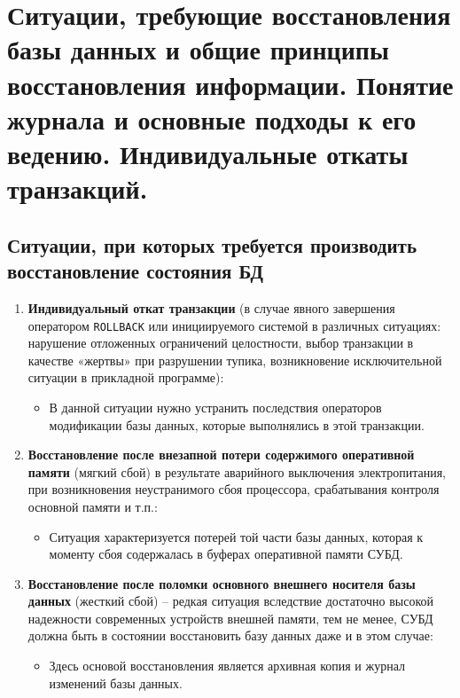 \documentclass[a4paper,12pt]{article}
\begin{document}
\section{Ситуации, требующие восстановления базы данных и общие принципы восстановления информации. Понятие журнала и основные подходы к его ведению. Индивидуальные откаты транзакций.}

\subsection{Ситуации, при которых требуется производить восстановление состояния БД}

\begin{enumerate}
    \item \textbf{Индивидуальный откат транзакции} (в случае явного завершения оператором \texttt{ROLLBACK} или инициируемого системой в различных ситуациях: нарушение отложенных ограничений целостности, выбор транзакции в качестве «жертвы» при разрушении тупика, возникновение исключительной ситуации в прикладной программе):
    \begin{itemize}
        \item В данной ситуации нужно устранить последствия операторов модификации базы данных, которые выполнялись в этой транзакции.
    \end{itemize}
    
    \item \textbf{Восстановление после внезапной потери содержимого оперативной памяти} (мягкий сбой) в результате аварийного выключения электропитания, при возникновения неустранимого сбоя процессора, срабатывания контроля основной памяти и т.п.:
    \begin{itemize}
        \item Ситуация характеризуется потерей той части базы данных, которая к моменту сбоя содержалась в буферах оперативной памяти СУБД.
    \end{itemize}
    
    \item \textbf{Восстановление после поломки основного внешнего носителя базы данных} (жесткий сбой) – редкая ситуация вследствие достаточно высокой надежности современных устройств внешней памяти, тем не менее, СУБД должна быть в состоянии восстановить базу данных даже и в этом случае:
    \begin{itemize}
        \item Здесь основой восстановления является архивная копия и журнал изменений базы данных.
    \end{itemize}
\end{enumerate}
\end{document}
